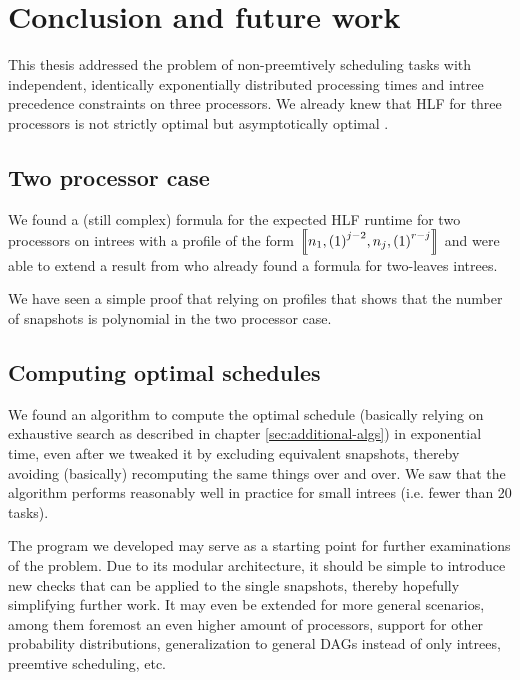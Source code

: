 
\chapter{Conclusion and future work}
\label{chap:conclusion-outlook}

This thesis addressed the problem of non-preemtively scheduling tasks with independent, identically exponentially distributed processing times and intree precedence constraints on three processors. We already knew that HLF for three processors is not strictly optimal \cite{chandyreynoldsshortpaper1975} but asymptotically optimal \cite{journals/siamcomp/PapadimitriouT87}.

\section{Two processor case}
\label{sec:conclusion-two-processor-case}

We found a (still complex) formula for the expected HLF runtime for two processors on intrees with a profile of the form
$\left\llbracket n_1,{(1)}^{j-2},n_j,{(1)}^{r-j} \right\rrbracket$
and were able to extend a result from \cite{MoritzMaasDiploma} who already found a formula for two-leaves intrees.

We have seen a simple proof that relying on profiles that shows that the number of snapshots is polynomial in the two processor case.

\section{Computing optimal schedules}
\label{sec:conclusion-optimal-schedules}

We found an algorithm to compute the optimal schedule (basically relying on exhaustive search as described in chapter \ref{sec:additional-algs}) in exponential time, even after we tweaked it by excluding equivalent snapshots, thereby avoiding (basically) recomputing the same things over and over. We saw that the algorithm performs reasonably well in practice for small intrees (i.e. fewer than 20 tasks).

The program we developed may serve as a starting point for further examinations of the problem. Due to its modular architecture, it should be simple to introduce new checks that can be applied to the single snapshots, thereby hopefully simplifying further work. It may even be extended for more general scenarios, among them foremost an even higher amount of processors, support for other probability distributions, generalization to general DAGs instead of only intrees, preemtive scheduling, etc.

